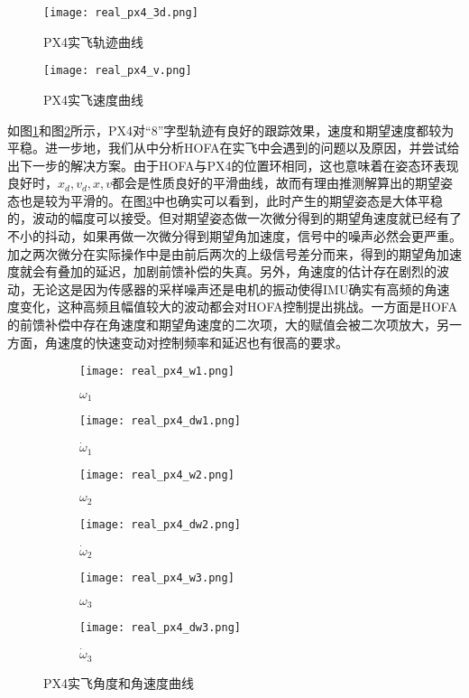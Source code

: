 \begin{figure}[!h]
  \centering
    \texttt{[image: real\_px4\_3d.png]}
    \caption{PX4实飞轨迹曲线}
    \label{real_px4_3d}
  \end{figure}
  \begin{figure}[!h]
    \centering
      \texttt{[image: real\_px4\_v.png]}
      \caption{PX4实飞速度曲线}
      \label{real_px4_v}

\end{figure}



如图\ref{real_px4_3d}和图\ref{real_px4_v}所示，PX4对“8”字型轨迹有良好的跟踪效果，速度和期望速度都较为平稳。进一步地，我们从中分析HOFA在实飞中会遇到的问题以及原因，并尝试给出下一步的解决方案。由于HOFA与PX4的位置环相同，这也意味着在姿态环表现良好时，$x_d,v_d,x,v$都会是性质良好的平滑曲线，故而有理由推测解算出的期望姿态也是较为平滑的。在图\ref{real_px4_wdw}中也确实可以看到，此时产生的期望姿态是大体平稳的，波动的幅度可以接受。但对期望姿态做一次微分得到的期望角速度就已经有了不小的抖动，如果再做一次微分得到期望角加速度，信号中的噪声必然会更严重。加之两次微分在实际操作中是由前后两次的上级信号差分而来，得到的期望角加速度就会有叠加的延迟，加剧前馈补偿的失真。另外，角速度的估计存在剧烈的波动，无论这是因为传感器的采样噪声还是电机的振动使得IMU确实有高频的角速度变化，这种高频且幅值较大的波动都会对HOFA控制提出挑战。一方面是HOFA的前馈补偿中存在角速度和期望角速度的二次项，大的赋值会被二次项放大，另一方面，角速度的快速变动对控制频率和延迟也有很高的要求。


\begin{figure}[!h]
  \centering
  \begin{subfigure}[b]{0.49\textwidth}
      \centering
      \texttt{[image: real\_px4\_w1.png]}
      \caption{$\omega_1$}
  \end{subfigure}
  \hfill
  \begin{subfigure}[b]{0.49\textwidth}
      \centering
      \texttt{[image: real\_px4\_dw1.png]}
      \caption{$\dot \omega_1$}
  \end{subfigure}
  
  \begin{subfigure}[b]{0.49\textwidth}
      \centering
      \texttt{[image: real\_px4\_w2.png]}
      \caption{$\omega_2$}
  \end{subfigure}
  \hfill
  \begin{subfigure}[b]{0.49\textwidth}
      \centering
      \texttt{[image: real\_px4\_dw2.png]}
      \caption{$\dot \omega_2$}
  \end{subfigure}
  
  \begin{subfigure}[b]{0.49\textwidth}
      \centering
      \texttt{[image: real\_px4\_w3.png]}
      \caption{$\omega_3$}
  \end{subfigure}
  \hfill
  \begin{subfigure}[b]{0.49\textwidth}
      \centering
      \texttt{[image: real\_px4\_dw3.png]}
      \caption{$\dot \omega_3$}
  \end{subfigure}
  \caption{PX4实飞角度和角速度曲线}
  \label{real_px4_wdw}
\end{figure}

